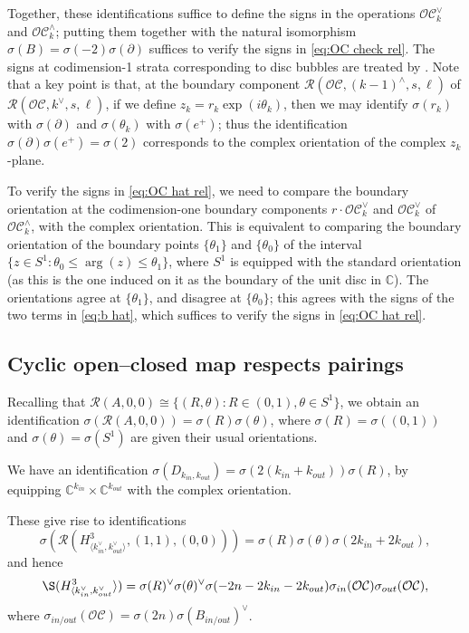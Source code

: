 \documentclass{article}
\def\cO{\mathcal{O}}
\def\cC{\mathcal{C}}
\def\cR{\mathcal{R}}
\def\C{\mathbb{C}}
\begin{document}
Together, these identifications suffice to define the signs in the operations $\cO\cC^\vee_k$ and $\cO\cC^\wedge_k$; putting them together with the natural isomorphism $\sigma(B) = \sigma(-2)\sigma(\partial)$ suffices to verify the signs in \eqref{eq:OC check rel}. 
The signs at codimension-1 strata corresponding to disc bubbles are treated by \cite[Lemma C.1]{relfukii}. 
Note that a key point is that, at the boundary component $\cR(\cO\cC,(k-1)^\wedge,s,\ell)$ of $\cR(\cO\cC,k^\vee,s,\ell)$, if we define $z_k = r_k\exp(i\theta_k)$, then we may identify $\sigma(r_k)$ with $\sigma(\partial)$ and $\sigma(\theta_k)$ with $\sigma(e^+)$; thus the identification $\sigma(\partial)\sigma(e^+) = \sigma(2)$ corresponds to the complex orientation of the complex $z_k$-plane. 

To verify the signs in \eqref{eq:OC hat rel}, we need to compare the boundary orientation at the codimension-one boundary components $r \cdot \cO\cC^\vee_k$ and $\cO\cC^\vee_k$ of $\cO\cC^\wedge_k$, with the complex orientation. 
This is equivalent to comparing the boundary orientation of the boundary points $\{\theta_1\}$ and $\{\theta_0\}$ of the interval $\{z \in S^1: \theta_0 \le \arg(z) \le \theta_1\}$, where $S^1$ is equipped with the standard orientation (as this is the one induced on it as the boundary of the unit disc in $\C$). 
The orientations agree at $\{\theta_1\}$, and disagree at $\{\theta_0\}$; this agrees with the signs of the two terms in \eqref{eq:b hat}, which suffices to verify the signs in \eqref{eq:OC hat rel}.

\subsection{Cyclic open--closed map respects pairings}

Recalling that $\cR(A,0,0) \cong \{(R,\theta):R \in (0,1),\theta \in S^1\}$, we obtain an identification $\sigma(\cR(A,0,0)) = \sigma(R)\sigma(\theta)$, where $\sigma(R) = \sigma((0,1))$ and $\sigma(\theta) = \sigma(S^1)$ are given their usual orientations. 

We have an identification $\sigma(D_{k_{in},k_{out}}) = \sigma(2(k_{in}+k_{out})) \sigma(R)$, by equipping $\C^{k_{in}} \times \C^{k_{out}}$ with the complex orientation. 

These give rise to identifications 
\begin{equation}\label{eq:RH3 or}
    \sigma(\cR(H^3_{\langle k_{in}^\vee,k_{out}^\vee\rangle},(1,1),(0,0))) = \sigma(R)\sigma(\theta)\sigma(2k_{in}+2k_{out}),
\end{equation}
and hence
$$\S(H^3_{\langle k_{in}^\vee,k_{out}^\vee}\rangle ) = \sigma(R)^\vee\sigma(\theta)^\vee \sigma(-2n-2k_{in}-2k_{out}) \sigma_{in}(\cO\cC)\sigma_{out}(\cO\cC),$$
where $\sigma_{in/out}(\cO\cC) = \sigma(2n)\sigma(B_{in/out})^\vee$. 
\end{document}
